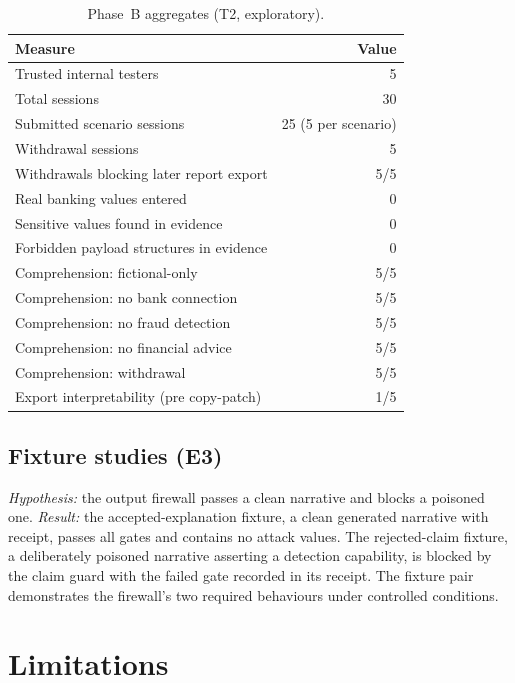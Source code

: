\documentclass[conference]{IEEEtran}
\begin{document}
\begin{table}[t]
\caption{Phase~B aggregates (T2, exploratory).}
\centering
\footnotesize
\begin{tabular}{lr}
\toprule
Measure & Value \\
\midrule
Trusted internal testers & 5 \\
Total sessions & 30 \\
Submitted scenario sessions & 25 (5 per scenario) \\
Withdrawal sessions & 5 \\
Withdrawals blocking later report export & 5/5 \\
Real banking values entered & 0 \\
Sensitive values found in evidence & 0 \\
Forbidden payload structures in evidence & 0 \\
Comprehension: fictional-only & 5/5 \\
Comprehension: no bank connection & 5/5 \\
Comprehension: no fraud detection & 5/5 \\
Comprehension: no financial advice & 5/5 \\
Comprehension: withdrawal & 5/5 \\
Export interpretability (pre copy-patch) & 1/5 \\
\bottomrule
\end{tabular}
\label{tab:phaseb}
\end{table}

\subsection{Fixture studies (E3)}

\emph{Hypothesis:} the output firewall passes a clean narrative and blocks a
poisoned one. \emph{Result:} the accepted-explanation fixture, a clean generated
narrative with receipt, passes all gates and contains no attack values. The
rejected-claim fixture, a deliberately poisoned narrative asserting a detection
capability, is blocked by the claim guard with the failed gate recorded in its
receipt. The fixture pair demonstrates the firewall's two required behaviours
under controlled conditions.

\section{Limitations}
\end{document}
